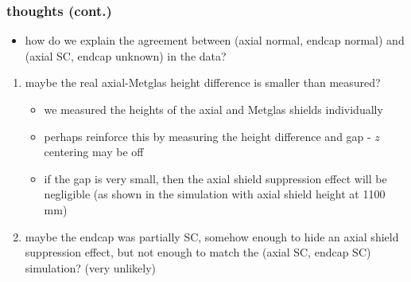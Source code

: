\documentclass{beamer}
\begin{document}
\begin{frame}
\frametitle{thoughts (cont.)}

    \begin{itemize}
    \item how do we explain the agreement between (axial normal, endcap normal) and (axial SC, endcap unknown)
    in the data?
    \end{itemize}
    \begin{enumerate}
    \item maybe the real axial-Metglas height difference is smaller than measured? 
        \begin{itemize}
        \item we measured the heights of the axial and Metglas shields individually
        \item perhaps reinforce this by measuring the height difference and gap - $z$ centering may be off
        \item if the gap is very small, then the axial shield suppression effect will be negligible (as shown
        in the simulation with axial shield height at 1100 mm)
        \end{itemize}
    \item maybe the endcap was partially SC, somehow enough to hide an axial shield suppression effect, but
    not enough to match the (axial SC, endcap SC) simulation? (very unlikely)
    \end{enumerate}

\end{frame}
\end{document}
